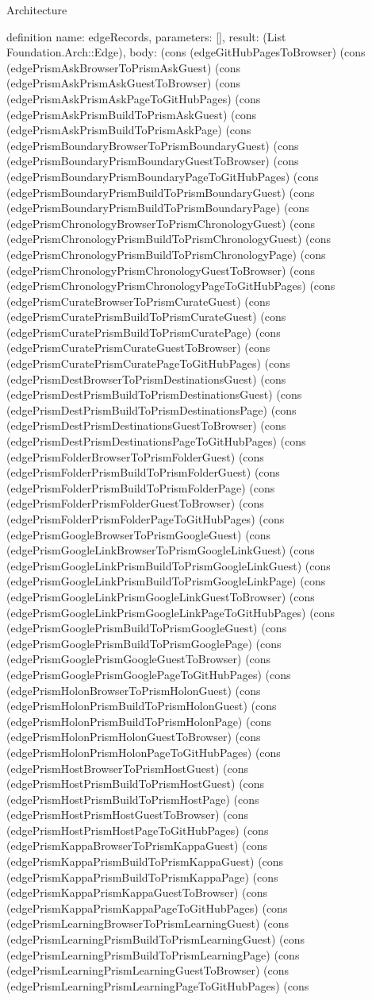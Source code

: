 \begin{lexlean}{Architecture}
\begin{semanticmodule}
definition{
  name: edgeRecords,
  parameters: [],
  result: (List Foundation.Arch::Edge),
  body: (cons (edgeGitHubPagesToBrowser) (cons (edgePrismAskBrowserToPrismAskGuest) (cons (edgePrismAskPrismAskGuestToBrowser) (cons (edgePrismAskPrismAskPageToGitHubPages) (cons (edgePrismAskPrismBuildToPrismAskGuest) (cons (edgePrismAskPrismBuildToPrismAskPage) (cons (edgePrismBoundaryBrowserToPrismBoundaryGuest) (cons (edgePrismBoundaryPrismBoundaryGuestToBrowser) (cons (edgePrismBoundaryPrismBoundaryPageToGitHubPages) (cons (edgePrismBoundaryPrismBuildToPrismBoundaryGuest) (cons (edgePrismBoundaryPrismBuildToPrismBoundaryPage) (cons (edgePrismChronologyBrowserToPrismChronologyGuest) (cons (edgePrismChronologyPrismBuildToPrismChronologyGuest) (cons (edgePrismChronologyPrismBuildToPrismChronologyPage) (cons (edgePrismChronologyPrismChronologyGuestToBrowser) (cons (edgePrismChronologyPrismChronologyPageToGitHubPages) (cons (edgePrismCurateBrowserToPrismCurateGuest) (cons (edgePrismCuratePrismBuildToPrismCurateGuest) (cons (edgePrismCuratePrismBuildToPrismCuratePage) (cons (edgePrismCuratePrismCurateGuestToBrowser) (cons (edgePrismCuratePrismCuratePageToGitHubPages) (cons (edgePrismDestBrowserToPrismDestinationsGuest) (cons (edgePrismDestPrismBuildToPrismDestinationsGuest) (cons (edgePrismDestPrismBuildToPrismDestinationsPage) (cons (edgePrismDestPrismDestinationsGuestToBrowser) (cons (edgePrismDestPrismDestinationsPageToGitHubPages) (cons (edgePrismFolderBrowserToPrismFolderGuest) (cons (edgePrismFolderPrismBuildToPrismFolderGuest) (cons (edgePrismFolderPrismBuildToPrismFolderPage) (cons (edgePrismFolderPrismFolderGuestToBrowser) (cons (edgePrismFolderPrismFolderPageToGitHubPages) (cons (edgePrismGoogleBrowserToPrismGoogleGuest) (cons (edgePrismGoogleLinkBrowserToPrismGoogleLinkGuest) (cons (edgePrismGoogleLinkPrismBuildToPrismGoogleLinkGuest) (cons (edgePrismGoogleLinkPrismBuildToPrismGoogleLinkPage) (cons (edgePrismGoogleLinkPrismGoogleLinkGuestToBrowser) (cons (edgePrismGoogleLinkPrismGoogleLinkPageToGitHubPages) (cons (edgePrismGooglePrismBuildToPrismGoogleGuest) (cons (edgePrismGooglePrismBuildToPrismGooglePage) (cons (edgePrismGooglePrismGoogleGuestToBrowser) (cons (edgePrismGooglePrismGooglePageToGitHubPages) (cons (edgePrismHolonBrowserToPrismHolonGuest) (cons (edgePrismHolonPrismBuildToPrismHolonGuest) (cons (edgePrismHolonPrismBuildToPrismHolonPage) (cons (edgePrismHolonPrismHolonGuestToBrowser) (cons (edgePrismHolonPrismHolonPageToGitHubPages) (cons (edgePrismHostBrowserToPrismHostGuest) (cons (edgePrismHostPrismBuildToPrismHostGuest) (cons (edgePrismHostPrismBuildToPrismHostPage) (cons (edgePrismHostPrismHostGuestToBrowser) (cons (edgePrismHostPrismHostPageToGitHubPages) (cons (edgePrismKappaBrowserToPrismKappaGuest) (cons (edgePrismKappaPrismBuildToPrismKappaGuest) (cons (edgePrismKappaPrismBuildToPrismKappaPage) (cons (edgePrismKappaPrismKappaGuestToBrowser) (cons (edgePrismKappaPrismKappaPageToGitHubPages) (cons (edgePrismLearningBrowserToPrismLearningGuest) (cons (edgePrismLearningPrismBuildToPrismLearningGuest) (cons (edgePrismLearningPrismBuildToPrismLearningPage) (cons (edgePrismLearningPrismLearningGuestToBrowser) (cons (edgePrismLearningPrismLearningPageToGitHubPages) (cons }
\end{semanticmodule}
\end{lexlean}

